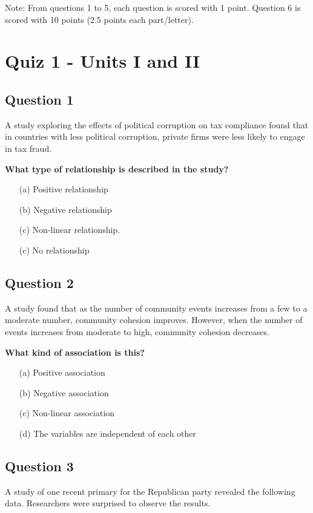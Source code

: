 \documentclass{article}
\begin{document}
Note: From questions 1 to 5, each question is scored with 1 point. Question 6 is scored with 10 points (2.5 points each part/letter).

\section*{Quiz 1 - Units I and II}

\subsection*{Question 1}
A study exploring the effects of political corruption on tax compliance found that in countries with less political corruption, private firms were less likely to engage in tax fraud.

\textbf{What type of relationship is described in the study?}
\begin{enumerate}
    \item[(a)] Positive relationship
    \item[(b)] Negative relationship
    \item[(c)] Non-linear relationship.
    \item[(c)] No relationship
\end{enumerate}

\subsection*{Question 2}
A study found that as the number of community events increases from a few to a moderate number, community cohesion improves. However, when the number of events increases from moderate to high, community cohesion decreases.

\textbf{What kind of association is this?}
\begin{enumerate}
    \item[(a)] Positive association
    \item[(b)] Negative association
    \item[(c)] Non-linear association
    \item[(d)] The variables are independent of each other
\end{enumerate}

\subsection*{Question 3}
A study of one recent primary for the Republican party revealed the following data. Researchers were surprised to observe the results.
\end{document}
